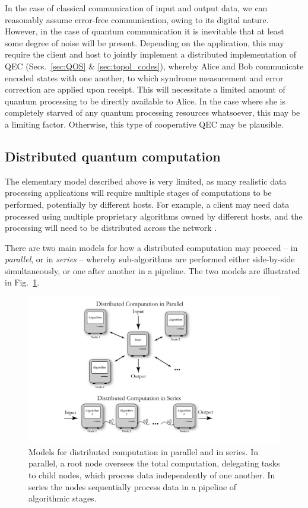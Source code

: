 \documentclass[aps, rmp, twocolumn, amsmath, amssymb, nofootinbib, superscriptaddress, longbibliography, floatfix, table-of-contents, eqsecnum]{revtex4-1}
\begin{document}
In the case of classical communication of input and output data, we can reasonably assume error-free communication, owing to its digital nature. However, in the case of quantum communication it is inevitable that at least some degree of noise will be present. Depending on the application, this may require the client and host to jointly implement a distributed implementation of QEC (Secs.~\ref{sec:QOS} \& \ref{sec:topol_codes}), whereby Alice and Bob communicate encoded states with one another, to which syndrome measurement and error correction are applied upon receipt. This will necessitate a limited amount of quantum processing to be directly available to Alice. In the case where she is completely starved of any quantum processing resources whatsoever, this may be a limiting factor. Otherwise, this type of cooperative QEC may be plausible.

%
%

\subsection{Distributed quantum computation} \label{sec:dist_QC} 

The elementary model described above is very limited, as many realistic data processing applications will require multiple stages of computations to be performed, potentially by different hosts. For example, a client may need data processed using multiple proprietary algorithms owned by different hosts, and the processing will need to be distributed across the network \cite{bib:Cirac99}.

There are two main models for how a distributed computation may proceed -- in \textit{parallel}, or in \textit{series} -- whereby sub-algorithms are performed either side-by-side simultaneously, or one after another in a pipeline. The two models are illustrated in Fig.~\ref{fig:distributed}.

\begin{figure}[!htb]
\includegraphics[width=\columnwidth]{distributed}
\caption{Models for distributed computation in parallel and in series. In parallel, a root node oversees the total computation, delegating tasks to child nodes, which process data independently of one another. In series the nodes sequentially process data in a pipeline of algorithmic stages.} \label{fig:distributed}
\end{figure}
\end{document}
